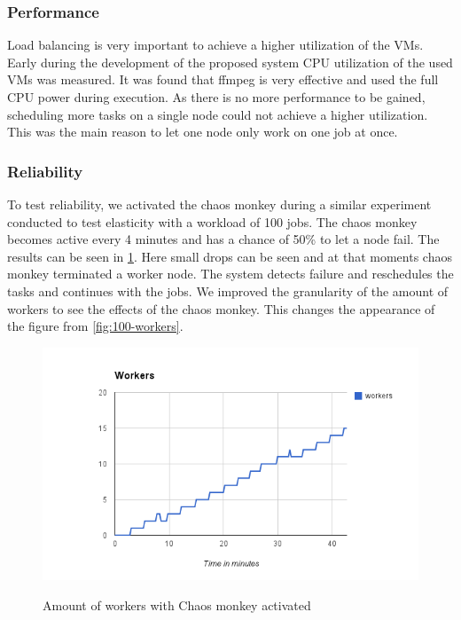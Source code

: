 \documentclass[a4paper]{IEEEtran}
\begin{document}
\subsubsection{Performance}
Load balancing is very important to achieve a higher utilization of the VMs.
Early during the development of the proposed system CPU utilization of the used VMs was measured.
It was found that ffmpeg is very effective and used the full CPU power during execution.
As there is no more performance to be gained, scheduling more tasks on a single node could not achieve a higher utilization.
This was the main reason to let one node only work on one job at once.

\subsubsection{Reliability}
To test reliability, we activated the chaos monkey during a similar experiment conducted to test elasticity with a workload of 100 jobs.
The chaos monkey becomes active every 4 minutes and has a chance of 50\% to let a node fail.
The results can be seen in \ref{fig:chaos-workers}.
Here small drops can be seen and at that moments chaos monkey terminated a worker node.
The system detects failure and reschedules the tasks and continues with the jobs.
We improved the granularity of the amount of workers to see the effects of the chaos monkey.
This changes the appearance of the figure from \ref{fig:100-workers}.

\begin{figure}[ht]
	\includegraphics[scale=0.5]{fig/chaos-workers.png}
	\label{fig:chaos-workers}
	\caption{Amount of workers with Chaos monkey activated}
\end{figure}
\end{document}
